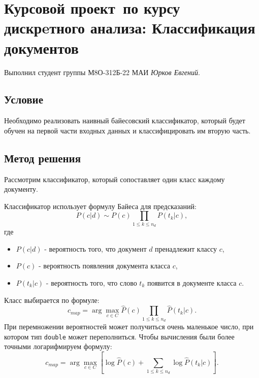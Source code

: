 \documentclass[12pt]{article}
\begin{document}
\section*{Курсовой проект\, по курсу дискрeтного анализа: Классификация документов}

Выполнил студент группы М8О-312Б-22 МАИ \textit{Юрков Евгений}.

\subsection*{Условие}

Необходимо реализовать наивный байесовский классификатор, который будет обучен на первой части входных данных и классифицировать им вторую часть.

\subsection*{Метод решения}
Рассмотрим классификатор, который сопоставляет один класс каждому документу.

Классификатор использует формулу Байеса для предсказаний:
$$P(c|d) \sim P(c) \prod_{1 \leq k \leq n_d} P(t_k | c),$$
где
\begin{itemize}
    \item $P(c|d)$ - вероятность того, что документ $d$ пренадлежит классу $c$,
    \item $P(c)$ - вероятность появления документа класса $c$,
    \item $P(t_k | c)$ - вероятность того, что слово $t_k$ появится в документе класса $c$.
\end{itemize}

Класс выбирается по формуле:
$$c_{map} = \arg \max_{c \in C} \widehat{P}(c) \prod_{1 \leq k \leq n_d}
\widehat{P}(t_k | c).$$ При перемножении вероятностей может получиться очень
маленькое число, при котором тип \texttt{double} может переполниться.
Чтобы вычисления были более точными логарифмируем формулу:
$$c_{map} = \arg \max_{c \in C} [ \log \widehat{P}(c) + \sum_{1 \leq k \leq n_d}
\log \widehat{P}(t_k | c) ].$$
\end{document}
